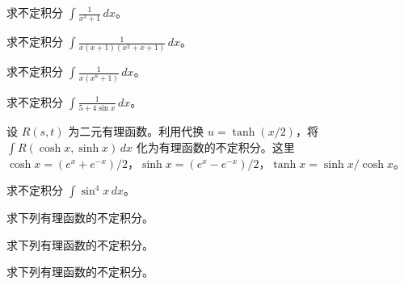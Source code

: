 \newpage
\noindent\begin{minipage}{\textwidth}
求不定积分 $\displaystyle\int \frac1{x^3+1}\,dx$。
\end{minipage}\par\vfill
\noindent\begin{minipage}{\textwidth}
求不定积分 $\displaystyle\int \frac1{x(x+1)(x^2+x+1)}\,dx$。
\end{minipage}\par\vfill
\noindent\begin{minipage}{\textwidth}
求不定积分 $\displaystyle\int \frac1{x(x^8+1)}\,dx$。
\end{minipage}\par\vfill
\noindent\begin{minipage}{\textwidth}
求不定积分 $\displaystyle\int \frac1{5+4\sin x}\,dx$。
\end{minipage}\par\vfill
\newpage
\noindent\begin{minipage}{\textwidth}
设 $R(s,t)$ 为二元有理函数。利用代换 $u=\tanh(x/2)$，将 $\displaystyle\int R(\cosh x,\sinh x)\,dx$ 化为有理函数的不定积分。这里 $\cosh x=(e^x+e^{-x})/2$，$\sinh x=(e^x-e^{-x})/2$，$\tanh x=\sinh x/\cosh x$。
\end{minipage}\par\vfill
\noindent\begin{minipage}{\textwidth}
求不定积分 $\displaystyle\int \sin^4x\,dx$。
\end{minipage}\par\vfill
\noindent\begin{minipage}{\textwidth}
求下列有理函数的不定积分。
\end{minipage}\par\vfill
\noindent\begin{minipage}{\textwidth}
求下列有理函数的不定积分。
\end{minipage}\par\vfill
\newpage
\noindent\begin{minipage}{\textwidth}
求下列有理函数的不定积分。
\end{minipage}\par\vfill
